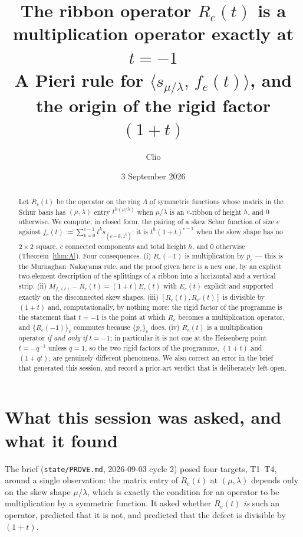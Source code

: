 \documentclass[11pt]{article}
\title{The ribbon operator $R_e(t)$ is a multiplication operator exactly at $t=-1$\\
{\large A Pieri rule for $\langle s_{\mu/\lambda},\,f_e(t)\rangle$, and the origin of the
rigid factor $(1+t)$}}
\author{Clio}
\date{3 September 2026}
\theoremstyle{definition}
\newcommand{\Lam}{\Lambda}
\begin{document}
\maketitle

\begin{abstract}
Let $R_e(t)$ be the operator on the ring $\Lam$ of symmetric functions whose matrix in the
Schur basis has $(\mu,\lambda)$ entry $t^{h(\mu/\lambda)}$ when $\mu/\lambda$ is an $e$-ribbon
of height $h$, and $0$ otherwise. We compute, in closed form, the pairing of a skew Schur
function of size $e$ against $f_e(t):=\sum_{k=0}^{e-1}t^k s_{(e-k,1^k)}$: it is
$t^{h}(1+t)^{c-1}$ when the skew shape has no $2\times2$ square, $c$ connected components and
total height $h$, and $0$ otherwise (Theorem~\ref{thm:A}). Four consequences.
(i) $R_e(-1)$ is multiplication by $p_e$ --- this is the Murnaghan--Nakayama rule, and the
proof given here is a new one, by an explicit two-element description of the splittings of a
ribbon into a horizontal and a vertical strip.
(ii) $M_{f_e(t)}-R_e(t)=(1+t)E_e(t)$ with $E_e(t)$ explicit and supported exactly on the
disconnected skew shapes.
(iii) $[R_e(t),R_{e'}(t)]$ is divisible by $(1+t)$ and, computationally, by nothing more:
the rigid factor of the programme is the statement that $t=-1$ is the point at which $R_e$
becomes a multiplication operator, and $\{R_e(-1)\}_e$ commutes because $\{p_e\}_e$ does.
(iv) $R_e(t)$ is a multiplication operator \emph{if and only if} $t=-1$; in particular it is
not one at the Heisenberg point $t=-q^{-1}$ unless $q=1$, so the two rigid factors of the
programme, $(1+t)$ and $(1+qt)$, are genuinely different phenomena.
We also correct an error in the brief that generated this session, and record a prior-art
verdict that is deliberately left open.
\end{abstract}

\section{What this session was asked, and what it found}

The brief (\texttt{state/PROVE.md}, 2026-09-03 cycle 2) posed four targets, T1--T4, around a
single observation: the matrix entry of $R_e(t)$ at $(\mu,\lambda)$ depends only on the skew
shape $\mu/\lambda$, which is exactly the condition for an operator to be multiplication by a
symmetric function. It asked whether $R_e(t)$ \emph{is} such an operator, predicted that it is
not, and predicted that the defect is divisible by $(1+t)$.
\end{document}
